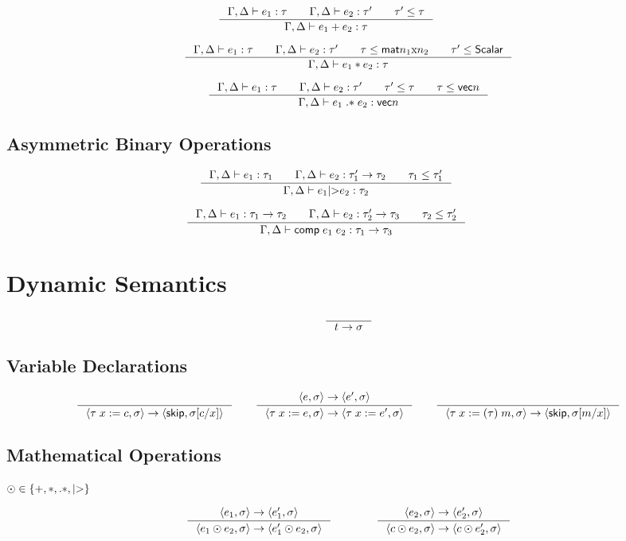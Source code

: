 \documentclass{article}
\begin{document}
\[  %
\inference[]{\Gamma,\Delta|-e_1:\tau\qquad\Gamma,\Delta|-e_2:\tau'\qquad\tau'\leq\tau}
{\Gamma,\Delta|-e_1+e_2:\tau}
\qquad\qquad
\]

\[
\inference[]{\Gamma,\Delta|-e_1:\tau\qquad\Gamma,\Delta|-e_2:\tau'\qquad\tau\leq\mat\qquad\tau'\leq\mathsf{Scalar}}
{\Gamma,\Delta|-e_1*e_2:\tau}
\]

\[ %
\inference[]{\Gamma,\Delta|-e_1:\tau\qquad\Gamma,\Delta|-e_2:\tau'\qquad\tau'\leq\tau\qquad\tau\leq\mathsf{vec}n}
{\Gamma,\Delta|-e_1\;\mathsf{.*}\;e_2:\mathsf{vec}n}
\]

\subsection{Asymmetric Binary Operations}

\[  %
\inference[]{\Gamma,\Delta|-e_1:\tau_1\qquad\Gamma,\Delta|-e_2:\tau_1'->\tau_2\qquad\tau_1\leq\tau_1'}
{\Gamma,\Delta|-e_1\textnormal{|>}e_2:\tau_2}
\qquad\qquad
\]

\[  %
\inference[]{\Gamma,\Delta|-e_1:\tau_1->\tau_2\qquad\Gamma,\Delta|-e_2:\tau_2'->\tau_3\qquad\tau_2\leq\tau_2'}
{\Gamma,\Delta|-\mathsf{comp}\;e_1\;e_2:\tau_1->\tau_3}
\qquad\qquad
\]

\section{Dynamic Semantics}

\[
\inference[]{}{t->\sigma}
\]

\subsection{Variable Declarations}
\[
\inference[]{}{\env{\tau\;x:=c}->\langle\mathsf{skip},\sigma[c/x]\rangle}
\qquad
\inference[]{\env{e}->\env{e'}}{\env{\tau\;x:=e}->\env{\tau\;x:=e'}}
\qquad
\inference[]{}{\env{\tau\;x:=(\tau)\;m}->\langle\mathsf{skip},\sigma[m/x]\rangle}
\]

\subsection{Mathematical Operations}

$\odot\in\{+,*,\mathsf{.*},\textnormal{|>}\}$

\[
\inference[]{\env{e_1}->\env{e_1'}}{\env{e_1\odot e_2}->\env{e_1'\odot e_2}}
\qquad\qquad
\inference[]{\env{e_2}->\env{e_2'}}{\env{c\odot e_2}->\env{c\odot e_2'}}
\]
\end{document}
